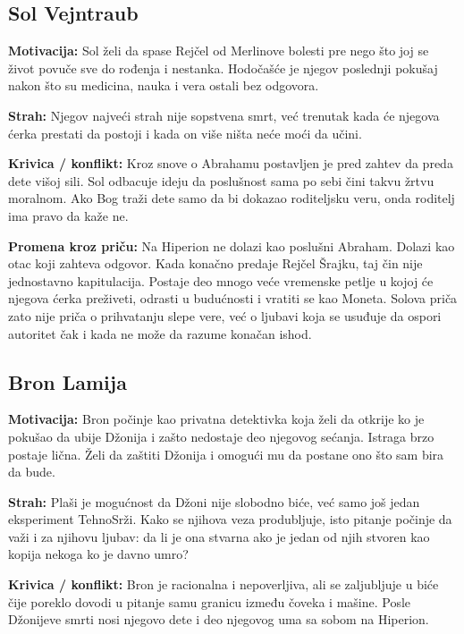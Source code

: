 \subsection*{Sol Vejntraub}

\textbf{Motivacija:} Sol želi da spase Rejčel od Merlinove bolesti pre nego što joj se život povuče sve do rođenja i nestanka. Hodočašće je njegov poslednji pokušaj nakon što su medicina, nauka i vera ostali bez odgovora.

\textbf{Strah:} Njegov najveći strah nije sopstvena smrt, već trenutak kada će njegova ćerka prestati da postoji i kada on više ništa neće moći da učini.

\textbf{Krivica / konflikt:} Kroz snove o Abrahamu postavljen je pred zahtev da preda dete višoj sili. Sol odbacuje ideju da poslušnost sama po sebi čini takvu žrtvu moralnom. Ako Bog traži dete samo da bi dokazao roditeljsku veru, onda roditelj ima pravo da kaže ne.

\textbf{Promena kroz priču:} Na Hiperion ne dolazi kao poslušni Abraham. Dolazi kao otac koji zahteva odgovor. Kada konačno predaje Rejčel Šrajku, taj čin nije jednostavno kapitulacija. Postaje deo mnogo veće vremenske petlje u kojoj će njegova ćerka preživeti, odrasti u budućnosti i vratiti se kao Moneta. Solova priča zato nije priča o prihvatanju slepe vere, već o ljubavi koja se usuđuje da ospori autoritet čak i kada ne može da razume konačan ishod.


\subsection*{Bron Lamija}

\textbf{Motivacija:} Bron počinje kao privatna detektivka koja želi da otkrije ko je pokušao da ubije Džonija i zašto nedostaje deo njegovog sećanja. Istraga brzo postaje lična. Želi da zaštiti Džonija i omogući mu da postane ono što sam bira da bude.

\textbf{Strah:} Plaši je mogućnost da Džoni nije slobodno biće, već samo još jedan eksperiment TehnoSrži. Kako se njihova veza produbljuje, isto pitanje počinje da važi i za njihovu ljubav: da li je ona stvarna ako je jedan od njih stvoren kao kopija nekoga ko je davno umro?

\textbf{Krivica / konflikt:} Bron je racionalna i nepoverljiva, ali se zaljubljuje u biće čije poreklo dovodi u pitanje samu granicu između čoveka i mašine. Posle Džonijeve smrti nosi njegovo dete i deo njegovog uma sa sobom na Hiperion.

